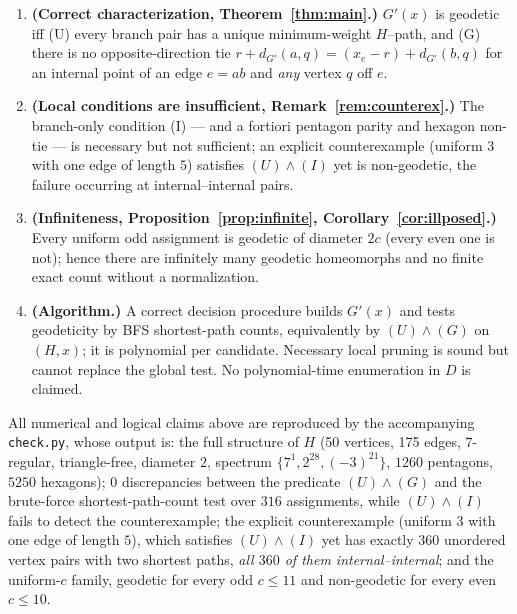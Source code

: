 \documentclass{amsart}
\theoremstyle{definition}
\begin{document}
\begin{enumerate}
\item \textbf{(Correct characterization, Theorem~\ref{thm:main}.)} $G'(x)$ is
geodetic iff (U) every branch pair has a unique minimum-weight $H$--path, and
(G) there is no opposite-direction tie
$r+d_{G'}(a,q)=(x_e-r)+d_{G'}(b,q)$ for an internal point of an edge $e=ab$ and
\emph{any} vertex $q$ off $e$.
\item \textbf{(Local conditions are insufficient,
Remark~\ref{rem:counterex}.)} The branch-only condition (I) --- and a fortiori
pentagon parity and hexagon non-tie --- is necessary but not sufficient; an
explicit counterexample (uniform $3$ with one edge of length $5$) satisfies
$(U)\wedge(I)$ yet is non-geodetic, the failure occurring at internal--internal
pairs.
\item \textbf{(Infiniteness, Proposition~\ref{prop:infinite},
Corollary~\ref{cor:illposed}.)} Every uniform odd assignment is geodetic of
diameter $2c$ (every even one is not); hence there are infinitely many geodetic
homeomorphs and no finite exact count without a normalization.
\item \textbf{(Algorithm.)} A correct decision procedure builds $G'(x)$ and
tests geodeticity by BFS shortest-path counts, equivalently by $(U)\wedge(G)$ on
$(H,x)$; it is polynomial per candidate. Necessary local pruning is sound but
cannot replace the global test. No polynomial-time enumeration in $D$ is claimed.
\end{enumerate}

All numerical and logical claims above are reproduced by the accompanying
\texttt{check.py}, whose output is: the full structure of $H$ (50 vertices, 175
edges, $7$-regular, triangle-free, diameter $2$, spectrum
$\{7^1,2^{28},(-3)^{21}\}$, $1260$ pentagons, $5250$ hexagons); $0$ discrepancies
between the predicate $(U)\wedge(G)$ and the brute-force shortest-path-count test
over $316$ assignments, while $(U)\wedge(I)$ fails to detect the counterexample;
the explicit counterexample (uniform $3$ with one edge of length $5$), which
satisfies $(U)\wedge(I)$ yet has exactly $360$ unordered vertex pairs with two
shortest paths, \emph{all $360$ of them internal--internal}; and the uniform-$c$
family, geodetic for every odd $c\le11$ and non-geodetic for every even
$c\le10$.
\end{document}
